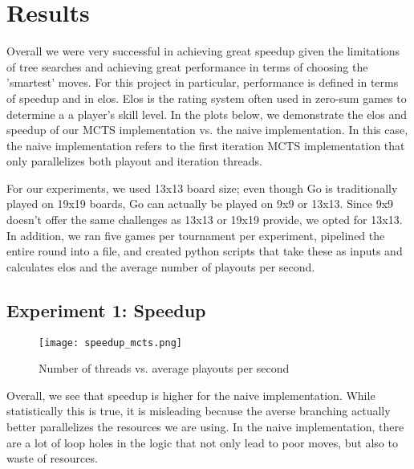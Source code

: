 \documentclass[11pt]{article}
\begin{document}


\section*{Results}
Overall we were very successful in achieving great speedup given the limitations of tree searches and achieving great performance in terms of choosing the 'smartest' moves. For this project in particular, performance is defined in terms of speedup and in elos. Elos is the rating system often used in zero-sum games to determine a a player's skill level. In the plots below, we demonstrate the elos and speedup of our MCTS implementation vs. the naive implementation. In this case, the naive implementation refers to the first iteration MCTS implementation that only parallelizes both playout and iteration threads. 

For our experiments, we used 13x13 board size; even though Go is traditionally played on 19x19 boards, Go can actually be played on 9x9 or 13x13. Since 9x9 doesn't offer the same challenges as 13x13 or 19x19 provide, we opted for 13x13. In addition, we ran five games per tournament per experiment, pipelined the entire round into a file, and created python scripts that take these as inputs and calculates elos and the average number of playouts per second. 

\subsection*{Experiment 1: Speedup}

\begin{figure}[ht!]
\begin{center}
\texttt{[image: speedup\_mcts.png]}
\caption{Number of threads vs. average playouts per second}
\end{center}
\end{figure}

Overall, we see that speedup is higher for the naive implementation. While statistically this is true, it is misleading because the averse branching actually better parallelizes the resources we are using. In the naive implementation, there are a lot of loop holes in the logic that not only lead to poor moves, but also to waste of resources. 
\end{document}
